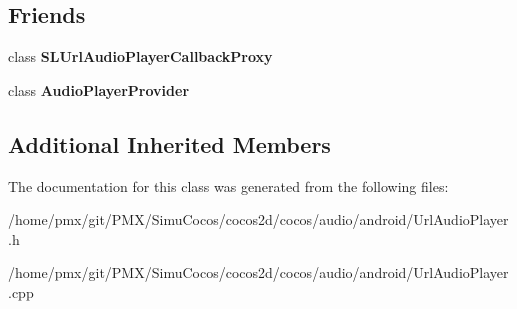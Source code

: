 \subsection*{Friends}
\begin{DoxyCompactItemize}
\item 
\mbox{\label{classcocos2d_1_1experimental_1_1UrlAudioPlayer_a309ff9278e06823249de0a366a543810}} 
class {\bfseries S\+L\+Url\+Audio\+Player\+Callback\+Proxy}
\item 
\mbox{\label{classcocos2d_1_1experimental_1_1UrlAudioPlayer_a0843db55a3a12f76fc06297731df3ac3}} 
class {\bfseries Audio\+Player\+Provider}
\end{DoxyCompactItemize}
\subsection*{Additional Inherited Members}


The documentation for this class was generated from the following files\+:\begin{DoxyCompactItemize}
\item 
/home/pmx/git/\+P\+M\+X/\+Simu\+Cocos/cocos2d/cocos/audio/android/Url\+Audio\+Player.\+h\item 
/home/pmx/git/\+P\+M\+X/\+Simu\+Cocos/cocos2d/cocos/audio/android/Url\+Audio\+Player.\+cpp\end{DoxyCompactItemize}
